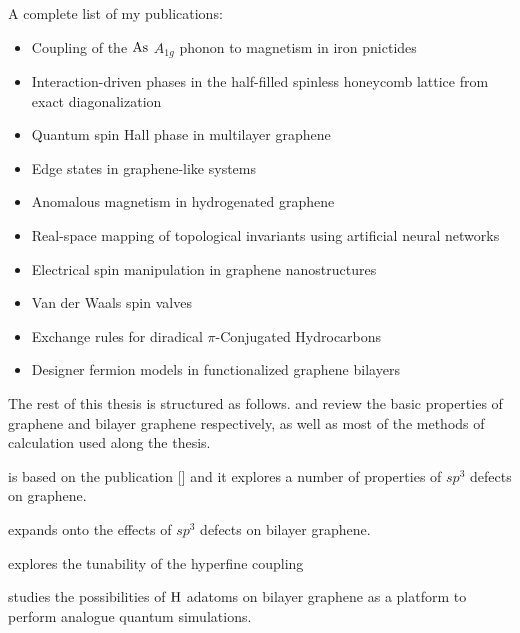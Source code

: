 \bigskip
A complete list of my publications:
\begin{itemize}
   \item Coupling of the $\ce{As}$ $A_{1g}$ phonon to magnetism in iron pnictides\cite{Garcia-Martinez2013}

   \item Interaction-driven phases in the half-filled spinless honeycomb lattice from exact diagonalization\cite{Garcia-Martinez2013a}

   \item Quantum spin Hall phase in multilayer graphene\cite{Garcia-Martinez2015}
   \item Edge states in graphene-like systems\cite{Lado2015}

   \item Anomalous magnetism in hydrogenated graphene\cite{Garcia-Martinez2017}

   \item Real-space mapping of topological invariants using artificial neural networks\cite{Carvalho2018}

   \item Electrical spin manipulation in graphene nanostructures\cite{Ortiz2018}

   \item Van der Waals spin valves\cite{Cardoso2018}

   \item Exchange rules for diradical $\pi$-Conjugated Hydrocarbons\cite{Ortiz2019}

   \item Designer fermion models in functionalized graphene bilayers\cite{Garcia-Martinez2019}
\end{itemize}



\bigskip
The rest of this thesis is structured as follows.  and  review the basic properties of graphene and bilayer graphene respectively, as well as most of the methods of calculation used along the thesis.

 is based on the publication [\cite{Garcia-Martinez2017}] and it explores a number of properties of $sp^3$ defects on graphene.

 expands onto the effects of $sp^3$ defects on bilayer graphene.

 explores the tunability of the hyperfine coupling

 studies the possibilities of $\ce{H}$ adatoms on bilayer graphene as a platform to perform analogue quantum simulations.






